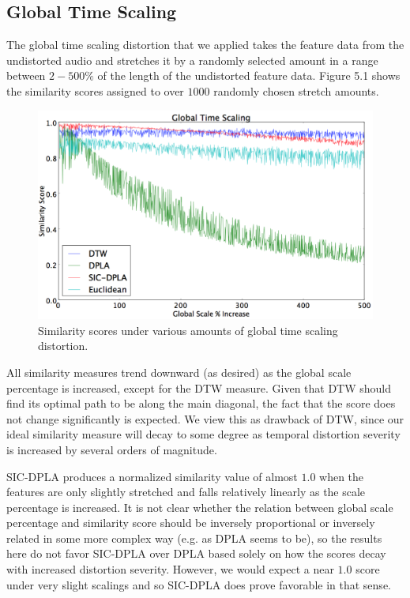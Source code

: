 \documentclass[a4paper,12pt]{report} 	%
\numberwithin{figure}{chapter}
\numberwithin{table}{chapter}
\numberwithin{equation}{chapter}
\begin{document}
\begin{flushleft}
\subsection{Global Time Scaling}
The global time scaling distortion that we applied takes the feature data from the undistorted audio and stretches it by a randomly selected amount in a range between $2-500\%$ of the length of the undistorted feature data. Figure 5.1 shows the similarity scores assigned to over $1000$ randomly chosen stretch amounts.
\begin{figure}[h!]
\begin{center}
\includegraphics[scale=0.5,width=\linewidth]{GlobalTimeScaling}
\caption[Global Time Scaling Results]{Similarity scores under various amounts of global time scaling distortion.}
\end{center}
\end{figure}
All similarity measures trend downward (as desired) as the global scale percentage is increased, except for the DTW measure. Given that DTW should find its optimal path to be along the main diagonal, the fact that the score does not change significantly is expected. We view this as drawback of DTW, since our ideal similarity measure will decay to some degree as temporal distortion severity is increased by several orders of magnitude.

SIC-DPLA produces a normalized similarity value of almost $1.0$ when the features are only slightly stretched and falls relatively linearly as the scale percentage is increased. It is not clear whether the relation between global scale percentage and similarity score should be inversely proportional or inversely related in some more complex way (e.g. as DPLA seems to be), so the results here do not favor SIC-DPLA over DPLA based solely on how the scores decay with increased distortion severity. However, we would expect a near $1.0$ score under very slight scalings and so SIC-DPLA does prove favorable in that sense.


\end{flushleft}
\end{document}
